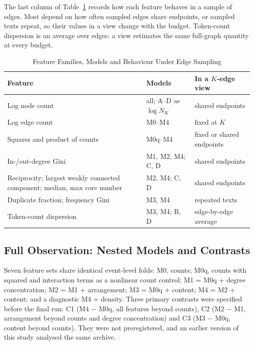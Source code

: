 \documentclass[conference]{IEEEtran}
\newcommand{\NK}{N_K}
\begin{document}
The last column of Table~\ref{tab:features} records how each feature behaves in a sample of edges. Most depend on how often sampled edges share endpoints, or sampled texts repeat, so their values in a view change with the budget. Token-count dispersion is an average over edges: a view estimates the same full-graph quantity at every budget.

\begin{table}[htbp]
\caption{Feature Families, Models and Behaviour Under Edge Sampling}
\begin{center}
\footnotesize
\setlength{\tabcolsep}{3pt}
\begin{tabular}{|>{\raggedright\arraybackslash}p{}|>{\raggedright\arraybackslash}p{}|>{\raggedright\arraybackslash}p{}|}
\hline
\textbf{Feature} & \textbf{Models} & \textbf{In a $K$-edge view} \\
\hline
Log node count & all; A--D as $\log\NK$ & shared endpoints \\ \hline
Log edge count & M0--M4 & fixed at $K$ \\ \hline
Squares and product of counts & M0q--M4 & fixed or shared endpoints \\ \hline
In-/out-degree Gini & M1, M2, M4; C, D & shared endpoints \\ \hline
Reciprocity; largest weakly connected component; median, max core number & M2, M4; C, D & shared endpoints \\ \hline
Duplicate fraction; frequency Gini & M3, M4 & repeated texts \\ \hline
Token-count dispersion & M3, M4; B, D & edge-by-edge average \\ \hline
\end{tabular}
\label{tab:features}
\end{center}
\end{table}

\subsection{Full Observation: Nested Models and Contrasts}
Seven feature sets share identical event-level folds: M0, counts; M0q, counts with squared and interaction terms as a nonlinear count control; M1 = M0q + degree concentration; M2 = M1 + arrangement; M3 = M0q + content; M4 = M2 + content; and a diagnostic M4 + density. Three primary contrasts were specified before the final run: C1 (M4 $-$ M0q, all features beyond counts), C2 (M2 $-$ M1, arrangement beyond counts and degree concentration) and C3 (M3 $-$ M0q, content beyond counts). They were not preregistered, and an earlier version of this study analysed the same archive.
\end{document}
